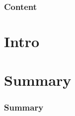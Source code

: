 

\maketitle
{}

\begin{frame} \frametitle{Content} \tableofcontents \end{frame}
\section{Intro} 


\section{Summary} 
\begin{frame} \frametitle{Summary} \tableofcontents \end{frame}




